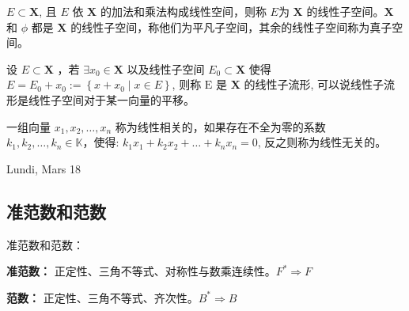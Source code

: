 \begin{definition}
    $E \subset \mathbf{X}$, 且 $E$ 依 $\mathbf{X}$ 的加法和乘法构成线性空间，则称 $E$为 $\mathbf{X}$ 的线性子空间。$\mathbf{X}$ 和 $\phi$ 都是 $\mathbf{X}$ 的线性子空间，称他们为平凡子空间，其余的线性子空间称为真子空间。
\end{definition}

\begin{definition}
    设 $E \subset \mathbf{X}$ ，若 $\exists x_0 \in \mathbf{X}$ 以及线性子空间 $E_0 \subset \mathbf{X}$ 使得 $E=E_0+x_0:=\left\{x+x_0 \mid x \in E\right\}$, 则称 $\mathrm{E}$ 是 $\mathbf{X}$ 的线性子流形, 可以说线性子流形是线性子空间对于某一向量的平移。
\end{definition}

\begin{definition}
    一组向量 $x_1, x_2, \ldots, x_n$ 称为线性相关的，如果存在不全为零的系数 $k_1, k_2, \ldots, k_n \in \mathbb{K}$，使得: $k_1 x_1+k_2 x_2+\ldots+k_n x_n=0$, 反之则称为线性无关的。
\end{definition}

\begin{center}
    Lundi, Mars 18
\end{center}

\subsection{准范数和范数}
\begin{definition}
    准范数和范数：
    \par\noindent\textbf{准范数：} 正定性、三角不等式、对称性与数乘连续性。$F^*\Longrightarrow F$

    \par\noindent\textbf{范数：} 正定性、三角不等式、齐次性。$B^*\Longrightarrow B$
\end{definition}

